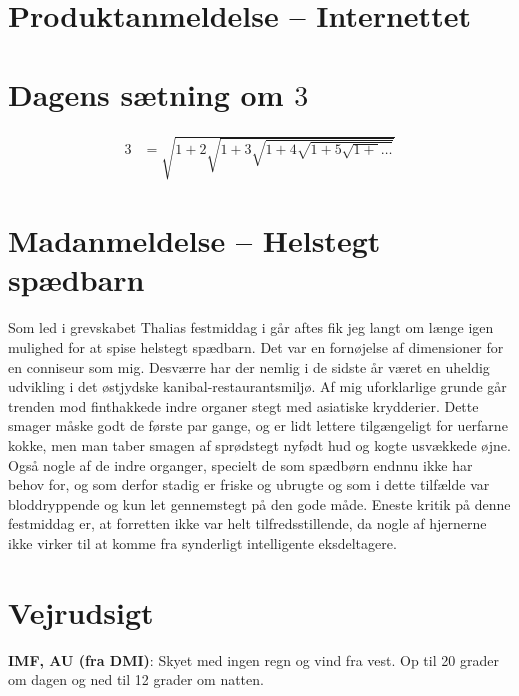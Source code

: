 

\begin{minipage}[b]{0.95\linewidth}
\begin{minipage}[t]{0.47\textwidth}
\vspace{3mm}
\section*{Produktanmeldelse -- Internettet}

\vspace{1mm}
\section*{Dagens sætning om $3$}
\begin{align*}
3 &= \sqrt{1+2\sqrt{1+3\sqrt{1+4\sqrt{1+5\sqrt{1+}\dots}}}}
\end{align*}

\vspace{1mm}
\section*{Madanmeldelse -- Helstegt spædbarn}

\vspace{2mm}
Som led i grevskabet Thalias festmiddag i går aftes fik jeg langt om længe igen mulighed for at spise helstegt spædbarn. Det var en fornøjelse af dimensioner for en conniseur som mig. Desværre har der nemlig i de sidste år været en uheldig udvikling i det østjydske kanibal-restaurantsmiljø. Af mig uforklarlige grunde går trenden mod finthakkede indre organer stegt med asiatiske krydderier. Dette smager måske godt de første par gange, og er lidt lettere tilgængeligt for uerfarne kokke, men man taber smagen af sprødstegt nyfødt hud og kogte usvækkede øjne. Også nogle af de indre organger, specielt de som spædbørn endnnu ikke har behov for, og som derfor stadig er friske og ubrugte og som i dette tilfælde var bloddryppende og kun let gennemstegt på den gode måde. Eneste kritik på denne festmiddag er, at forretten ikke var helt tilfredsstillende, da nogle af hjernerne ikke virker til at komme fra synderligt intelligente eksdeltagere.

\end{minipage}%
\hfill\begin{minipage}[t]{0.47\textwidth}
\vspace{3mm}
\section*{Vejrudsigt}
\textbf{IMF, AU (fra DMI)}: Skyet med ingen regn og vind fra vest. Op til 20 grader om dagen og ned til 12 grader om natten.


\end{minipage}
\end{minipage}
